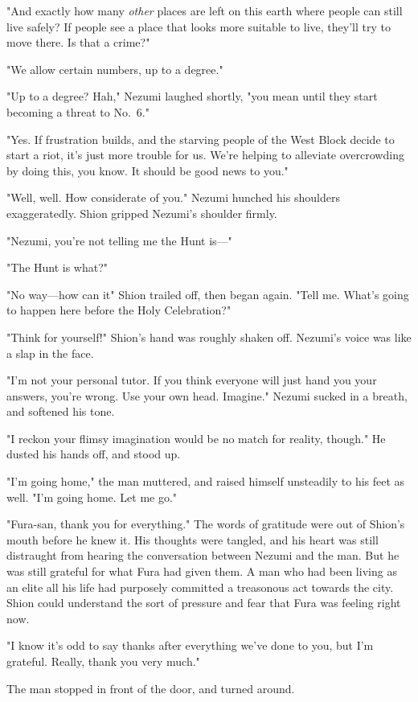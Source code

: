 "And exactly how many \emph{other} places are left on this earth where people
can still live safely? If people see a place that looks more suitable to
live, they'll try to move there. Is that a crime?"

"We allow certain numbers, up to a degree."

"Up to a degree? Hah," Nezumi laughed shortly, "you mean until they
start becoming a threat to No.~6."

"Yes. If frustration builds, and the starving people of the West Block
decide to start a riot, it's just more trouble for us. We're helping to
alleviate overcrowding by doing this, you know. It should be good news
to you."

"Well, well. How considerate of you." Nezumi hunched his shoulders
exaggeratedly. Shion gripped Nezumi's shoulder firmly.

"Nezumi, you're not telling me the Hunt is---"

"The Hunt is what?"

"No way---how can it\el " Shion trailed off, then began again. "Tell me.
What's going to happen here before the Holy Celebration?"

"Think for yourself!" Shion's hand was roughly shaken off. Nezumi's
voice was like a slap in the face.

"I'm not your personal tutor. If you think everyone will just hand you
your answers, you're wrong. Use your own head. Imagine." Nezumi sucked
in a breath, and softened his tone.

"I reckon your flimsy imagination would be no match for reality,
though." He dusted his hands off, and stood up.

"I'm going home," the man muttered, and raised himself unsteadily to his
feet as well. "I'm going home. Let me go."

"Fura-san, thank you for everything." The words of gratitude were out of
Shion's mouth before he knew it. His thoughts were tangled, and his
heart was still distraught from hearing the conversation between Nezumi
and the man. But he was still grateful for what Fura had given them. A
man who had been living as an elite all his life had purposely committed
a treasonous act towards the city. Shion could understand the sort of
pressure and fear that Fura was feeling right now.

"I know it's odd to say thanks after everything we've done to you, but
I'm grateful. Really, thank you very much."

The man stopped in front of the door, and turned around.

